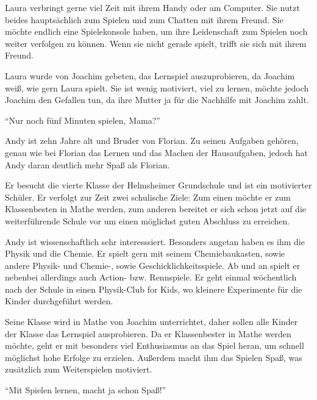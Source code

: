 \begin{description}
\begin{description}
			\item[Interessen und Hobbys]{Laura verbringt gerne viel Zeit mit ihrem Handy oder am Computer. Sie nutzt beides hauptsächlich zum Spielen und zum Chatten mit ihrem Freund. Sie möchte endlich eine Spielekonsole haben, um ihre Leidenschaft zum Spielen noch weiter verfolgen zu können. Wenn sie nicht gerade spielt, trifft sie sich mit ihrem Freund.}
			\item[Motivation]{Laura wurde von Joachim gebeten, das Lernspiel auszuprobieren, da Joachim weiß, wie gern Laura spielt. Sie ist wenig motiviert, viel zu lernen, möchte jedoch Joachim den Gefallen tun, da ihre Mutter ja für die Nachhilfe mit Joachim zahlt.}
			\item{\enquote{Nur noch fünf Minuten spielen, Mama?}}
		\end{description}
		\item[Andy Klein: Der Experte]<TODO: Bild>\hfill
		\begin{description}
			\item[Familiäres Umfeld]{Andy ist zehn Jahre alt und Bruder von Florian. Zu seinen Aufgaben gehören, genau wie bei Florian das Lernen und das Machen der Hausaufgaben, jedoch hat Andy daran deutlich mehr Spaß als Florian.}
			\item[Schulisches Umfeld]{Er besucht die vierte Klasse der Helmsheimer Grundschule und ist ein motivierter Schüler. Er verfolgt zur Zeit zwei schulische Ziele: Zum einen möchte er zum Klassenbesten in Mathe werden, zum anderen bereitet er sich schon jetzt auf die weiterführende Schule vor um einen möglichst guten Abschluss zu erreichen. }
			\item[Interessen und Hobbys]{Andy ist wissenschaftlich sehr interesssiert. Besonders angetan haben es ihm die Physik und die Chemie. Er spielt gern mit seinem Chemiebaukasten, sowie andere Physik- und Chemie-, sowie Geschicklichkeitsspiele. Ab und an spielt er nebenbei allerdings auch Action- bzw. Rennspiele. Er geht einmal wöchentlich nach der Schule in einen Physik-Club for Kids, wo kleinere Experimente für die Kinder durchgeführt werden.}
			\item[Motivation]{Seine Klasse wird in Mathe von Joachim unterrichtet, daher sollen alle Kinder der Klasse das Lernspiel ausprobieren. Da er Klassenbester in Mathe werden möchte, geht er mit besonders viel Enthusiasmus an das Spiel heran, um schnell möglichst hohe Erfolge zu erzielen. Außerdem macht ihm das Spielen Spaß, was zusätzlich zum Weiterspielen motiviert.}
			\item{\enquote{Mit Spielen lernen, macht ja schon Spaß!}}
		\end{description}
	\end{description}
